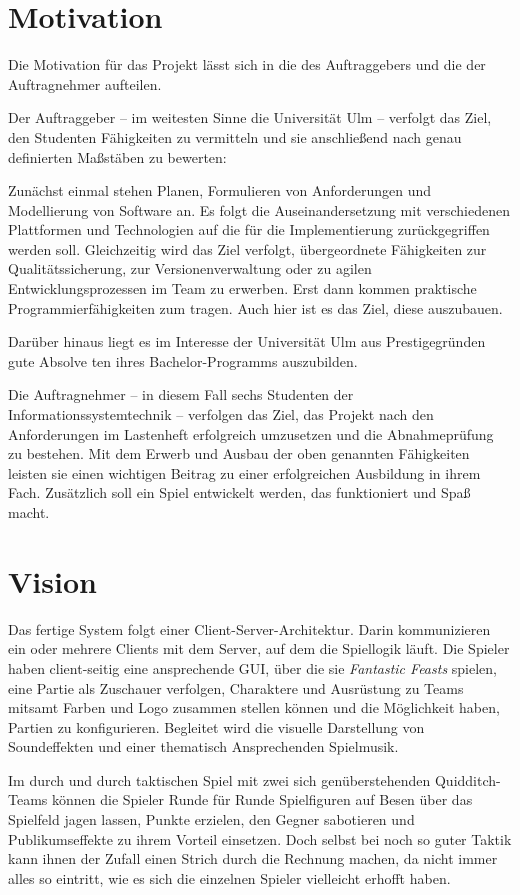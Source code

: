 \section{Motivation}
Die Motivation für das Projekt lässt sich in die des Auftraggebers und die der Auftragnehmer aufteilen.

Der Auftraggeber – im weitesten Sinne die Universität Ulm – verfolgt das Ziel, den Studenten Fähigkeiten zu vermitteln und sie anschließend nach genau definierten Maßstäben zu bewerten:

Zunächst einmal stehen Planen, Formulieren von Anforderungen und Modellierung von Software an. Es folgt die Auseinandersetzung mit verschiedenen Plattformen und Technologien auf die für die Implementierung zurückgegriffen werden soll. Gleichzeitig wird das Ziel verfolgt, übergeordnete Fähigkeiten zur Qualitätssicherung, zur Versionenverwaltung oder zu agilen Entwicklungsprozessen im Team zu erwerben. 
Erst dann kommen praktische Programmierfähigkeiten zum tragen. Auch hier ist es das Ziel, diese auszubauen.

Darüber hinaus liegt es im Interesse der Universität Ulm aus Prestigegründen gute Absolve ten ihres Bachelor-Programms auszubilden.

Die Auftragnehmer – in diesem Fall sechs Studenten der Informationssystemtechnik – verfolgen das Ziel, das Projekt nach den Anforderungen im Lastenheft erfolgreich umzusetzen und die Abnahmeprüfung zu bestehen. Mit dem Erwerb und Ausbau der oben genannten Fähigkeiten leisten sie einen wichtigen Beitrag zu einer erfolgreichen Ausbildung in ihrem Fach. Zusätzlich soll ein Spiel entwickelt werden, das funktioniert und Spaß macht.
 

\section{Vision}
Das fertige System folgt einer Client-Server-Architektur. Darin kommunizieren ein oder mehrere Clients mit dem Server, auf dem die Spiellogik läuft. Die Spieler haben client-seitig eine ansprechende GUI, über die sie \textit{Fantastic Feasts} spielen, eine Partie als Zuschauer verfolgen, Charaktere und Ausrüstung zu Teams mitsamt Farben und Logo zusammen stellen können und die Möglichkeit haben, Partien zu konfigurieren. Begleitet wird die visuelle Darstellung von Soundeffekten und einer thematisch Ansprechenden Spielmusik.

Im durch und durch taktischen Spiel mit zwei sich genüberstehenden Quidditch-Teams können die Spieler Runde für Runde Spielfiguren auf Besen über das Spielfeld jagen lassen, Punkte erzielen, den Gegner sabotieren und Publikumseffekte zu ihrem Vorteil einsetzen. Doch selbst bei noch so guter Taktik kann ihnen der Zufall einen Strich durch die Rechnung machen, da nicht immer alles so eintritt, wie es sich die einzelnen Spieler vielleicht erhofft haben.


